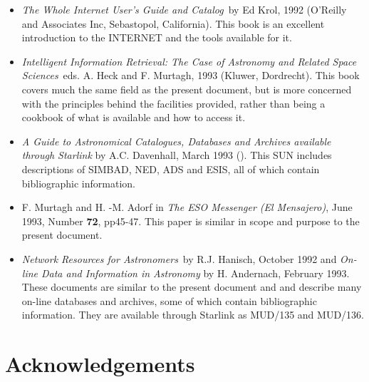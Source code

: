 \documentclass[twoside,11pt,nolof]{starlink}
\begin{document}
\begin{itemize}

  \item \textit{The Whole Internet User's Guide and
   Catalog}\, by Ed Krol, 1992 (O'Reilly and Associates Inc,
   Sebastopol, California). This book is an excellent introduction to
   the INTERNET and the tools available for it.

  \item \textit{Intelligent Information Retrieval: The Case of Astronomy
   and Related Space Sciences}\, eds. A. Heck and F. Murtagh, 1993
   (Kluwer, Dordrecht). This book covers much the same field as the
   present document, but is more concerned with the principles behind
   the facilities provided, rather than being a cookbook of what is
   available and how to access it.

  \item \textit{A Guide to Astronomical Catalogues, Databases and Archives
   available through Starlink} by A.C. Davenhall, March 1993
   ().
   This SUN includes descriptions of SIMBAD, NED, ADS and ESIS, all of
   which contain bibliographic information.

  \item F. Murtagh and H. -M. Adorf in \textit{The ESO Messenger (El
   Mensajero)}, June 1993, Number \textbf{72}, pp45-47. This paper is
   similar in scope and purpose to the present document.

  \item \textit{Network Resources for Astronomers}\, by R.J. Hanisch,
   October 1992 and \textit{On-line Data and Information in Astronomy}
   by H. Andernach, February 1993. These documents are similar to the
   present document and  and describe many on-line
   databases and
   archives, some of which contain bibliographic information. They are
   available through Starlink as MUD/135 and MUD/136.

\end{itemize}


\section{Acknowledgements}
\end{document}
